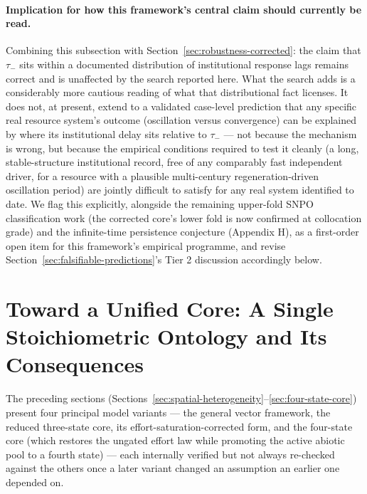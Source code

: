 \documentclass[twocolumn,10pt]{article}
\begin{document}
\paragraph{Implication for how this framework's central claim should currently be read.} Combining this subsection with Section~\ref{sec:robustness-corrected}: the claim that $\tau_-$ sits within a documented distribution of institutional response lags remains correct and is unaffected by the search reported here. What the search adds is a considerably more cautious reading of what that distributional fact licenses. It does not, at present, extend to a validated case-level prediction that any specific real resource system's outcome (oscillation versus convergence) can be explained by where its institutional delay sits relative to $\tau_-$ --- not because the mechanism is wrong, but because the empirical conditions required to test it cleanly (a long, stable-structure institutional record, free of any comparably fast independent driver, for a resource with a plausible multi-century regeneration-driven oscillation period) are jointly difficult to satisfy for any real system identified to date. We flag this explicitly, alongside the remaining upper-fold SNPO classification work (the corrected core's lower fold is now confirmed at collocation grade) and the infinite-time persistence conjecture (Appendix H), as a first-order open item for this framework's empirical programme, and revise Section~\ref{sec:falsifiable-predictions}'s Tier 2 discussion accordingly below.

\section{Toward a Unified Core: A Single Stoichiometric Ontology and Its Consequences}
\label{sec:unified-core}
The preceding sections (Sections~\ref{sec:spatial-heterogeneity}--\ref{sec:four-state-core}) present four principal model variants --- the general vector framework, the reduced three-state core, its effort-saturation-corrected form, and the four-state core (which restores the ungated effort law while promoting the active abiotic pool to a fourth state) --- each internally verified but not always re-checked against the others once a later variant changed an assumption an earlier one depended on.
\end{document}
